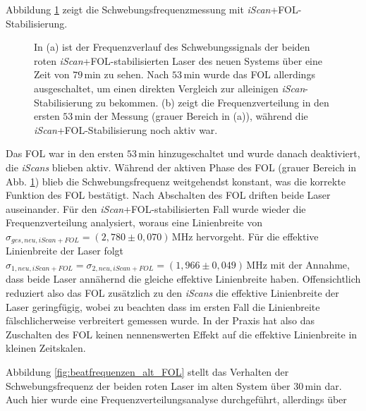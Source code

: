 Abbildung \ref{fig:beatfrequenzen_neu_iScan+FOL} zeigt die
Schwebungsfrequenzmessung mit \textit{iScan}+FOL-Stabilisierung.
\begin{figure}[hp]
 	\centering
 	\footnotesize
 	\fbox{\parbox{\dimexpr \linewidth - 2\fboxrule - 2\fboxsep}{
 	\subfloat[]{
		\label{subfig:beatfrequenzen_neu_iScan+FOL_drift}
		
		}\\
 	\subfloat[]{
		\label{subfig:beatfrequenzen_neu_iScan+FOL_histogramm}
		
		}
	}}
	\caption[Beatfrequenzen - neues System mit \textit{iScan}+FOL]{In (a) ist der
	Frequenzverlauf des Schwebungssignals der beiden roten
	\textit{iScan}+FOL-stabilisierten Laser des neuen Systems über eine Zeit von
	$79\,$min zu sehen. Nach $53\,$min wurde das FOL allerdings ausgeschaltet, um
	einen direkten Vergleich zur alleinigen \textit{iScan}-Stabilisierung zu
	bekommen. (b) zeigt die Frequenzverteilung in den ersten $53\,$min der Messung
	(grauer Bereich in (a)), während die \textit{iScan}+FOL-Stabilisierung noch
	aktiv war.}
	\label{fig:beatfrequenzen_neu_iScan+FOL}
\end{figure}
Das FOL war in den ersten $53\,$min hinzugeschaltet und wurde danach
deaktiviert, die \textit{iScans} blieben aktiv. Während der aktiven Phase des
FOL (grauer Bereich in Abb.
\ref{fig:beatfrequenzen_neu_iScan+FOL})
blieb die Schwebungsfrequenz weitgehendst konstant, was die korrekte Funktion des FOL bestätigt. Nach
Abschalten des FOL driften beide Laser auseinander. Für den
\textit{iScan}+FOL-stabilisierten Fall wurde wieder die Frequenzverteilung
analysiert, woraus eine Linienbreite von
$\sigma_{ges,neu,iScan+FOL}=(2,780\pm0,070)\,$MHz hervorgeht. Für die effektive
Linienbreite der Laser folgt
$\sigma_{1,neu,iScan+FOL}=\sigma_{2,neu,iScan+FOL}=(1,966\pm0,049)\,$MHz mit der
Annahme, dass beide Laser annähernd die gleiche effektive Linienbreite haben.
Offensichtlich reduziert also das FOL zusätzlich zu den \textit{iScans} die
effektive Linienbreite der Laser geringfügig, wobei zu beachten dass im ersten
Fall die Linienbreite fälschlicherweise verbreitert gemessen wurde. In der
Praxis hat also das Zuschalten des FOL keinen nennenswerten Effekt auf die
effektive Linienbreite in kleinen Zeitskalen.\par
Abbildung \ref{fig:beatfrequenzen_alt_FOL} stellt das Verhalten der
Schwebungsfrequenz der beiden roten Laser im alten System über $30\,$min dar.
Auch hier wurde eine Frequenzverteilungsanalyse durchgeführt, allerdings über
